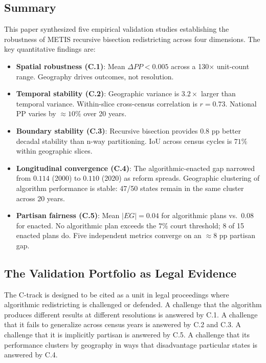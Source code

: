 
\subsection{Summary}

This paper synthesized five empirical validation studies establishing
the robustness of METIS recursive bisection redistricting across four
dimensions. The key quantitative findings are:

\begin{itemize}
  \item \textbf{Spatial robustness (C.1)}: Mean $\Delta PP < 0.005$
    across a 130$\times$ unit-count range. Geography drives outcomes,
    not resolution.

  \item \textbf{Temporal stability (C.2)}: Geographic variance is
    $3.2\times$ larger than temporal variance. Within-slice cross-census
    correlation is $r = 0.73$. National PP varies by $\approx 10\%$
    over 20 years.

  \item \textbf{Boundary stability (C.3)}: Recursive bisection provides
    $0.8$ pp better decadal stability than n-way partitioning. IoU
    across census cycles is $71\%$ within geographic slices.

  \item \textbf{Longitudinal convergence (C.4)}: The algorithmic-enacted
    gap narrowed from $0.114$ (2000) to $0.110$ (2020) as reform
    spreads. Geographic clustering of algorithm performance is stable:
    47/50 states remain in the same cluster across 20 years.

  \item \textbf{Partisan fairness (C.5)}: Mean $|EG| = 0.04$ for
    algorithmic plans vs.\ $0.08$ for enacted. No algorithmic plan
    exceeds the $7\%$ court threshold; 8 of 15 enacted plans do.
    Five independent metrics converge on an $\approx 8$ pp partisan
    gap.
\end{itemize}

\subsection{The Validation Portfolio as Legal Evidence}

The C-track is designed to be cited as a unit in legal proceedings
where algorithmic redistricting is challenged or defended. A challenge
that the algorithm produces different results at different resolutions
is answered by C.1. A challenge that it fails to generalize across
census years is answered by C.2 and C.3. A challenge that it is
implicitly partisan is answered by C.5. A challenge that its
performance clusters by geography in ways that disadvantage particular
states is answered by C.4.

